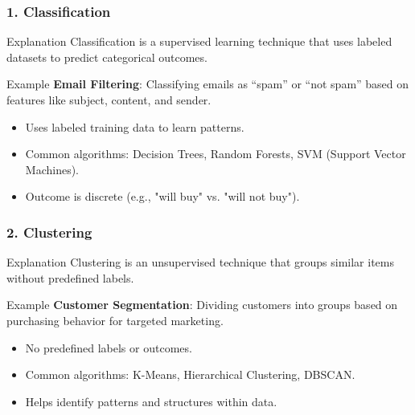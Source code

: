 \documentclass[aspectratio=169]{beamer}
\begin{document}
\begin{frame}[fragile]
    \frametitle{1. Classification}
    \begin{block}{Explanation}
        Classification is a supervised learning technique that uses labeled datasets to predict categorical outcomes.
    \end{block}
    \begin{exampleblock}{Example}
        \textbf{Email Filtering}: Classifying emails as “spam” or “not spam” based on features like subject, content, and sender.
    \end{exampleblock}
    \begin{itemize}
        \item Uses labeled training data to learn patterns.
        \item Common algorithms: Decision Trees, Random Forests, SVM (Support Vector Machines).
        \item Outcome is discrete (e.g., "will buy" vs. "will not buy").
    \end{itemize}
\end{frame}

\begin{frame}[fragile]
    \frametitle{2. Clustering}
    \begin{block}{Explanation}
        Clustering is an unsupervised technique that groups similar items without predefined labels.
    \end{block}
    \begin{exampleblock}{Example}
        \textbf{Customer Segmentation}: Dividing customers into groups based on purchasing behavior for targeted marketing.
    \end{exampleblock}
    \begin{itemize}
        \item No predefined labels or outcomes.
        \item Common algorithms: K-Means, Hierarchical Clustering, DBSCAN.
        \item Helps identify patterns and structures within data.
    \end{itemize}
\end{frame}
\end{document}
